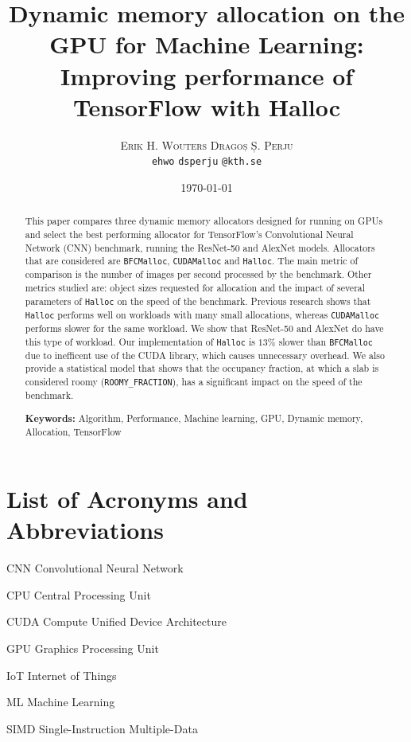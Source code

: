 \documentclass[12pt,twoside]{article}
\title{Dynamic memory allocation on the GPU for Machine Learning: Improving performance of TensorFlow with Halloc}
\author{
        \textsc{Erik H. Wouters}
            \qquad
        \textsc{Dragoș Ș. Perju} %
        \mbox{}\\
        \normalsize
            \texttt{ehwo}
        \textbar{}
            \texttt{dsperju}
        \normalsize
            \texttt{@kth.se}
}
\date{\today}
\begin{document}

\maketitle

\begin{abstract}
\label{sec:abstract}

This paper compares three dynamic memory allocators designed for running on GPUs and select the best performing allocator for TensorFlow’s Convolutional Neural Network (CNN) benchmark, running the ResNet-50 and AlexNet models. Allocators that are considered are \texttt{BFCMalloc}, \texttt{CUDAMalloc} and \texttt{Halloc}. The main metric of comparison is the number of images per second processed by the benchmark. Other metrics studied are: object sizes requested for allocation and the impact of several parameters of \texttt{Halloc} on the speed of the benchmark. Previous research shows that \texttt{Halloc} performs well on workloads with many small allocations, whereas \texttt{CUDAMalloc} performs slower for the same workload\cite{Vinkler2015}. We show that ResNet-50 and AlexNet do have this type of workload. Our implementation of \texttt{Halloc} is $13\%$ slower than \texttt{BFCMalloc} due to inefficent use of the CUDA library, which causes unnecessary overhead. We also provide a statistical model that shows that the occupancy fraction, at which a slab is considered roomy (\texttt{ROOMY\_FRACTION}), has a significant impact on the speed of the benchmark.


\textbf{Keywords:} Algorithm, Performance, Machine learning, GPU, Dynamic memory, Allocation, TensorFlow

\end{abstract}

\tableofcontents

\section*{List of Acronyms and Abbreviations}
\label{list-of-acronyms-and-abbreviations}

\begin{basedescript}{\desclabelstyle{\pushlabel}\desclabelwidth{10em}}
\item[CNN]					Convolutional Neural Network
\item[CPU]                  Central Processing Unit
\item[CUDA]                 Compute Unified Device Architecture
\item[GPU]                  Graphics Processing Unit
\item[IoT]                  Internet of Things
\item[ML]                   Machine Learning
\item[SIMD]                 Single-Instruction Multiple-Data
\end{basedescript}
\end{document}
